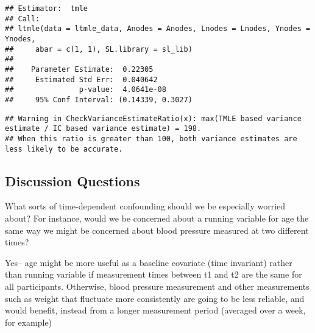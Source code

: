 \documentclass[
]{article}
\begin{document}
\begin{verbatim}
## Estimator:  tmle 
## Call:
## ltmle(data = ltmle_data, Anodes = Anodes, Lnodes = Lnodes, Ynodes = Ynodes, 
##     abar = c(1, 1), SL.library = sl_lib)
## 
##    Parameter Estimate:  0.22305 
##     Estimated Std Err:  0.040642 
##               p-value:  4.0641e-08 
##     95% Conf Interval: (0.14339, 0.3027)
\end{verbatim}

\begin{verbatim}
## Warning in CheckVarianceEstimateRatio(x): max(TMLE based variance estimate / IC based variance estimate) = 198.
## When this ratio is greater than 100, both variance estimates are less likely to be accurate.
\end{verbatim}

\subsection{Discussion Questions}\label{discussion-questions-2}

What sorts of time-dependent confounding should we be especially worried
about? For instance, would we be concerned about a running variable for
age the same way we might be concerned about blood pressure measured at
two different times?

Yes-- age might be more useful as a baseline covariate (time invariant)
rather than running variable if measurement times between t1 and t2 are
the same for all participants. Otherwise, blood pressure measurement and
other measurements such as weight that fluctuate more consistently are
going to be less reliable, and would benefit, instead from a longer
measurement period (averaged over a week, for example)
\end{document}
